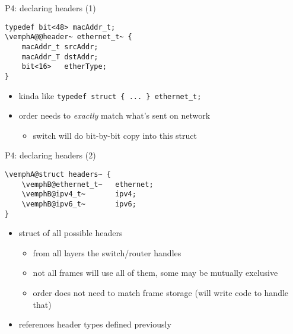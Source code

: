 \usetikzlibrary{arrows.meta,decorations.pathreplacing}


\begin{frame}[fragile]{P4: declaring headers (1)}
\providecommand{\vemphA}[1]{\myemph<2>{#1}}
\providecommand{\vemphB}[1]{\myemph<3>{#1}}
\providecommand{\vemphC}[1]{\myemph<4>{#1}}
\providecommand{\vemphD}[1]{\myemph<5>{#1}}
\begin{Verbatim}[fontsize=\small,commandchars=\\@~]
typedef bit<48> macAddr_t;
\vemphA@@header~ ethernet_t~ {
    macAddr_t srcAddr;
    macAddr_T dstAddr;
    bit<16>   etherType;
}
\end{Verbatim}
\begin{itemize}
\item<2-> kinda like \Verb|typedef struct { ... } ethernet_t;|
\item<3-> order needs to \textit{exactly} match what's sent on network
    \begin{itemize}
    \item switch will do bit-by-bit copy into this struct
    \end{itemize}
\end{itemize}
\end{frame}

\begin{frame}[fragile]{P4: declaring headers (2)}
\providecommand{\vemphA}[1]{\myemph<2>{#1}}
\providecommand{\vemphB}[1]{\myemph<3>{#1}}
\providecommand{\vemphC}[1]{\myemph<4>{#1}}
\providecommand{\vemphD}[1]{\myemph<5>{#1}}
\begin{Verbatim}[fontsize=\small,commandchars=\\@~]
\vemphA@struct headers~ {
    \vemphB@ethernet_t~   ethernet;
    \vemphB@ipv4_t~       ipv4;
    \vemphB@ipv6_t~       ipv6;
}
\end{Verbatim}
\begin{itemize}
\item<2-> struct of all possible headers
    \begin{itemize}
    \item from all layers the switch/router handles
    \item not all frames will use all of them, some may be mutually exclusive
    \item order does not need to match frame storage (will write code to handle that)
    \end{itemize}
\item<3-> references header types defined previously
\end{itemize}
\end{frame}

